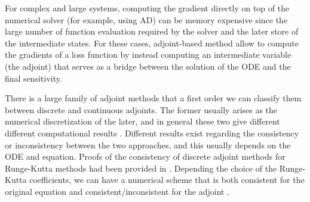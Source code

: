 For complex and large systems, computing the gradient directly on top of the numerical solver (for example, using AD) can be memory expensive since the large number of function evaluation required by the solver and the later store of the intermediate states. 
For these cases, adjoint-based method allow to compute the gradients of a loss function by instead computing an intermediate variable (the adjoint) that serves as a bridge between the solution of the ODE and the final sensitivity. 

There is a large family of adjoint methods that a first order we can classify them between discrete and continuous adjoints. 
The former usually arises as the numerical discretization of the later, and in general these two give different different computational results \cite{Sirkes_Tziperman_1997}.
Different results exist regarding the consistency or inconsistency between the two approaches, and this usually depends on the ODE and equation.  
Proofs of the consistency of discrete adjoint methods for Runge-Kutta methods had been provided in \cite{sandu2006properties, sandu2011solution}.
Depending the choice of the Runge-Kutta coefficients, we can have a numerical scheme that is both consistent for the original equation and consistent/inconsistent for the adjoint \cite{Hager_2000}.